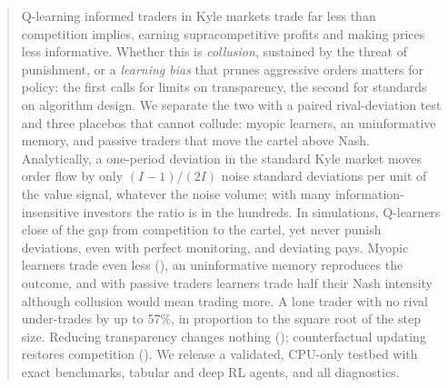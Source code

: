 \begin{abstract}
Q-learning informed traders in Kyle markets trade far less than competition
implies, earning supracompetitive profits and making prices less informative.
Whether this is \emph{collusion}, sustained by the threat of punishment, or a
\emph{learning bias} that prunes aggressive orders matters for policy: the
first calls for limits on transparency, the second for standards on algorithm
design. We separate the two with a paired rival-deviation test and three
placebos that cannot collude: myopic learners, an uninformative memory, and
passive traders that move the cartel above Nash. Analytically, a one-period
deviation in the standard Kyle market moves order flow by only $(I-1)/(2I)$
noise standard deviations per unit of the value signal, whatever the noise
volume; with many information-insensitive investors the ratio is in the
hundreds. In simulations, Q-learners close \ResidDeltaInt{} of the gap from
competition to the cartel, yet never punish deviations, even with perfect
monitoring, and deviating pays. Myopic learners trade even less
(\MyopicResidDeltaInt{}), an uninformative memory reproduces the outcome, and
with passive traders learners trade half their Nash intensity although
collusion would mean trading more. A lone trader with no rival under-trades by
up to 57\%, in proportion to the square root of the step size. Reducing
transparency changes nothing (\OpaqueDeltaInt{}); counterfactual updating
restores competition (\CfResidDeltaInt{}). \DouAbstractSentence{} We release a
validated, CPU-only testbed with exact benchmarks, tabular and deep RL agents,
and all diagnostics.
\end{abstract}
